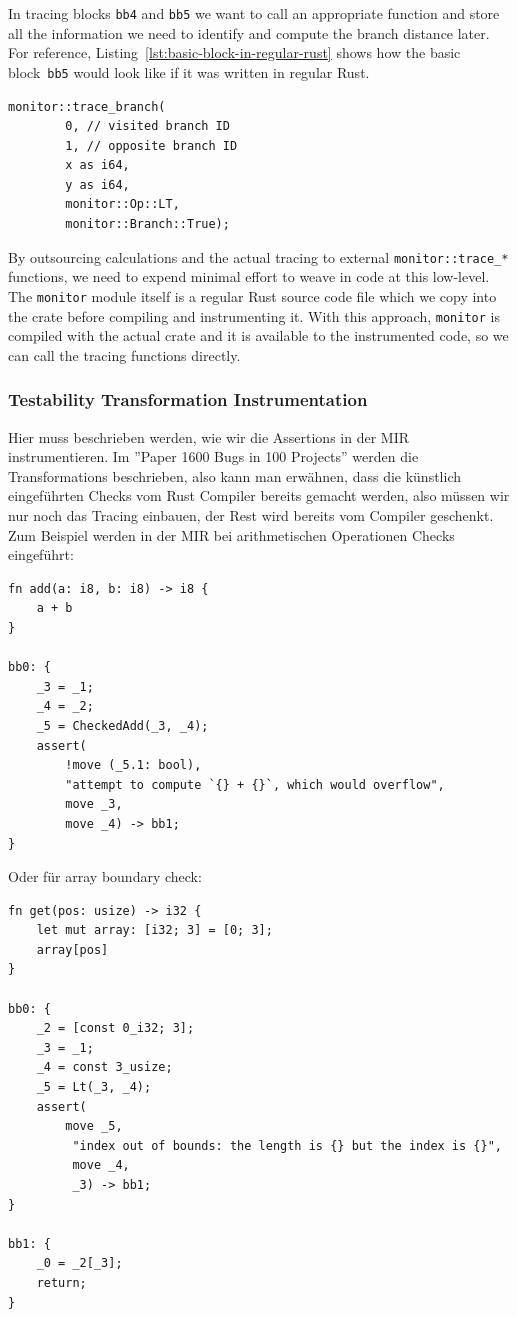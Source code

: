 \documentclass{article}
\begin{document}
In tracing blocks \lstinline{bb4} and \lstinline{bb5} we want to call an appropriate function and store all the information we need to identify and compute the branch distance later. For reference, Listing~\ref{lst:basic-block-in-regular-rust} shows how the basic block~\lstinline{bb5} would look like if it was written in regular Rust.

\begin{lstlisting}[language={}, style=boxed, caption={How would \lstinline{bb5} look like in regular Rust code}, label=lst:basic-block-in-regular-rust]
monitor::trace_branch(
        0, // visited branch ID
        1, // opposite branch ID
        x as i64,
        y as i64,
        monitor::Op::LT,
        monitor::Branch::True);
\end{lstlisting}

By outsourcing calculations and the actual tracing to external \lstinline{monitor::trace_*} functions, we need to expend minimal effort to weave in code at this low-level. The \lstinline{monitor} module itself is a regular Rust source code file which we copy into the crate before compiling and instrumenting it. With this approach, \lstinline{monitor} is compiled with the actual crate and it is available to the instrumented code, so we can call the tracing functions directly.

\subsubsection{Testability Transformation Instrumentation}
Hier muss beschrieben werden, wie wir die Assertions in der MIR instrumentieren.
Im ''Paper 1600 Bugs in 100 Projects'' werden die Transformations beschrieben, also kann man erwähnen, dass die künstlich eingeführten Checks vom Rust Compiler bereits gemacht werden, also müssen wir nur noch das Tracing einbauen, der Rest wird bereits vom Compiler geschenkt.
Zum Beispiel werden in der MIR bei arithmetischen Operationen Checks eingeführt:
\begin{lstlisting}[language={}, style=boxed, caption={MIR overflow check}, label=lst:mir-overflow-check]
fn add(a: i8, b: i8) -> i8 {
    a + b
}

bb0: {
    _3 = _1;
    _4 = _2;
    _5 = CheckedAdd(_3, _4);
    assert(
        !move (_5.1: bool),
        "attempt to compute `{} + {}`, which would overflow",
        move _3,
        move _4) -> bb1;
}
\end{lstlisting}

Oder für array boundary check:
\begin{lstlisting}[language={}, style=boxed, caption={MIR array boundary check}, label=lst:mir-boundary-check]
fn get(pos: usize) -> i32 {
    let mut array: [i32; 3] = [0; 3];
    array[pos]
}

bb0: {
    _2 = [const 0_i32; 3];
    _3 = _1;
    _4 = const 3_usize;
    _5 = Lt(_3, _4);
    assert(
        move _5,
         "index out of bounds: the length is {} but the index is {}",
         move _4,
         _3) -> bb1;
}

bb1: {
    _0 = _2[_3];
    return;
}
\end{lstlisting}
\end{document}
